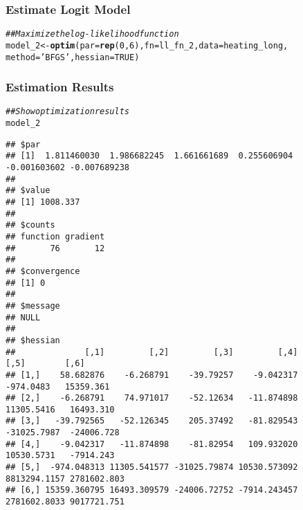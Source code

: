 \documentclass{beamer}\usepackage[]{graphicx}\usepackage[]{xcolor}
\makeatletter
\newcommand{\hlnum}[1]{\textcolor[rgb]{0.686,0.059,0.569}{#1}}%
\newcommand{\hlstr}[1]{\textcolor[rgb]{0.192,0.494,0.8}{#1}}%
\newcommand{\hlcom}[1]{\textcolor[rgb]{0.678,0.584,0.686}{\textit{#1}}}%
\newcommand{\hlstd}[1]{\textcolor[rgb]{0.345,0.345,0.345}{#1}}%
\newcommand{\hlkwb}[1]{\textcolor[rgb]{0.69,0.353,0.396}{#1}}%
\newcommand{\hlkwc}[1]{\textcolor[rgb]{0.333,0.667,0.333}{#1}}%
\newcommand{\hlkwd}[1]{\textcolor[rgb]{0.737,0.353,0.396}{\textbf{#1}}}%
\newenvironment{kframe}{%
 \def\at@end@of@kframe{}%
 \ifinner\ifhmode%
  \def\at@end@of@kframe{\end{minipage}}%
  \begin{minipage}{\columnwidth}%
 \fi\fi%
 \def\FrameCommand##1{\hskip\@totalleftmargin \hskip-\fboxsep
 \colorbox{shadecolor}{##1}\hskip-\fboxsep
     \hskip-\linewidth \hskip-\@totalleftmargin \hskip\columnwidth}%
 \MakeFramed {\advance\hsize-\width
   \@totalleftmargin\z@ \linewidth\hsize
   \@setminipage}}%
 {\par\unskip\endMakeFramed%
 \at@end@of@kframe}
\newenvironment{knitrout}{}{} %
\makeatother
\begin{document}
\begin{frame}[fragile]\frametitle{Estimate Logit Model}
\begin{knitrout}\footnotesize
{}\color{fgcolor}\begin{kframe}
\begin{alltt}
\hlcom{## Maximize the log-likelihood function}
\hlstd{model_2} \hlkwb{<-} \hlkwd{optim}\hlstd{(}\hlkwc{par} \hlstd{=} \hlkwd{rep}\hlstd{(}\hlnum{0}\hlstd{,} \hlnum{6}\hlstd{),} \hlkwc{fn} \hlstd{= ll_fn_2,} \hlkwc{data} \hlstd{= heating_long,}
                 \hlkwc{method} \hlstd{=} \hlstr{'BFGS'}\hlstd{,} \hlkwc{hessian} \hlstd{=} \hlnum{TRUE}\hlstd{)}
\end{alltt}
\end{kframe}
\end{knitrout}
\end{frame}

\begin{frame}[fragile]\frametitle{Estimation Results}
    \vspace{1ex}
    
\begin{knitrout}\tiny
{}\color{fgcolor}\begin{kframe}
\begin{alltt}
\hlcom{## Show optimization results}
\hlstd{model_2}
\end{alltt}
\begin{verbatim}
## $par
## [1]  1.811460030  1.986682245  1.661661689  0.255606904 -0.001603602 -0.007689238
## 
## $value
## [1] 1008.337
## 
## $counts
## function gradient 
##       76       12 
## 
## $convergence
## [1] 0
## 
## $message
## NULL
## 
## $hessian
##              [,1]         [,2]         [,3]         [,4]         [,5]        [,6]
## [1,]    58.682876    -6.268791    -39.79257    -9.042317    -974.0483   15359.361
## [2,]    -6.268791    74.971017    -52.12634   -11.874898   11305.5416   16493.310
## [3,]   -39.792565   -52.126345    205.37492   -81.829543  -31025.7987  -24006.728
## [4,]    -9.042317   -11.874898    -81.82954   109.932020   10530.5731   -7914.243
## [5,]  -974.048313 11305.541577 -31025.79874 10530.573092 8813294.1157 2781602.803
## [6,] 15359.360795 16493.309579 -24006.72752 -7914.243457 2781602.8033 9017721.751
\end{verbatim}
\end{kframe}
\end{knitrout}
\end{frame}
\end{document}
